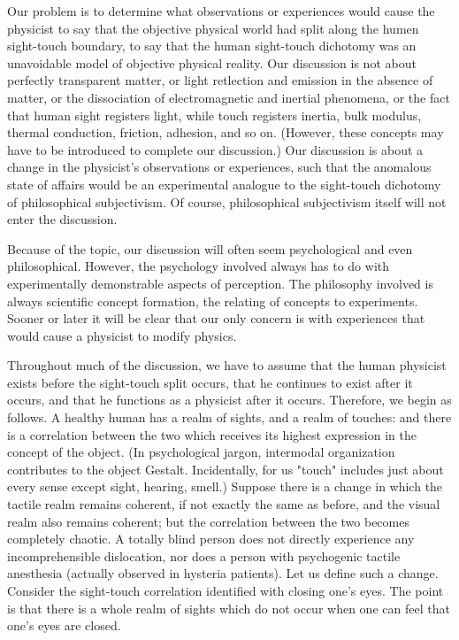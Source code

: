 \documentclass[10pt,twoside,draft]{memoir}
\begin{document}
{Our problem is to determine what observations or experiences would 
cause the physicist to say that the objective physical world had split along 
the humen sight-touch boundary, to say that the human sight-touch 
dichotomy was an unavoidable model of objective physical reality. Our 
discussion is not about perfectly transparent matter, or light retlection and 
emission in the absence of matter, or the dissociation of electromagnetic and 
inertial phenomena, or the fact that human sight registers light, while touch 
registers inertia, bulk modulus, thermal conduction, friction, adhesion, and 
so on. (However, these concepts may have to be introduced to complete our 
discussion.) Our discussion is about a change in the physicist's observations 
or experiences, such that the anomalous state of affairs would be an 
experimental analogue to the sight-touch dichotomy of philosophical 
subjectivism. Of course, philosophical subjectivism itself will not enter the 
discussion. 

Because of the topic, our discussion will often seem psychological and 
even philosophical. However, the psychology involved always has to do with 
experimentally demonstrable aspects of perception. The philosophy involved 
is always scientific concept formation, the relating of concepts to 
experiments. Sooner or later it will be clear that our only concern is with 
experiences that would cause a physicist to modify physics. 

Throughout much of the discussion, we have to assume that the human 
physicist exists before the sight-touch split occurs, that he continues to exist 
after it occurs, and that he functions as a physicist after it occurs. Therefore, 
we begin as follows. A healthy human has a realm of sights, and a realm of 
touches: and there is a correlation between the two which receives its highest 
expression in the concept of the object. (In psychological jargon, intermodal 
organization contributes to the object Gestalt. Incidentally, for us "touch" 
includes just about every sense except sight, hearing, smell.) Suppose there is 
a change in which the tactile realm remains coherent, if not exactly the same 
as before, and the visual realm also remains coherent; but the correlation 
between the two becomes completely chaotic. A totally blind person does 
not directly experience any incomprehensible dislocation, nor does a person 
with psychogenic tactile anesthesia (actually observed in hysteria patients). 
Let us define such a change. Consider the sight-touch correlation identified 
with closing one's eyes. The point is that there is a whole realm of sights 
which do not occur when one can feel that one's eyes are closed. 

}
\end{document}
